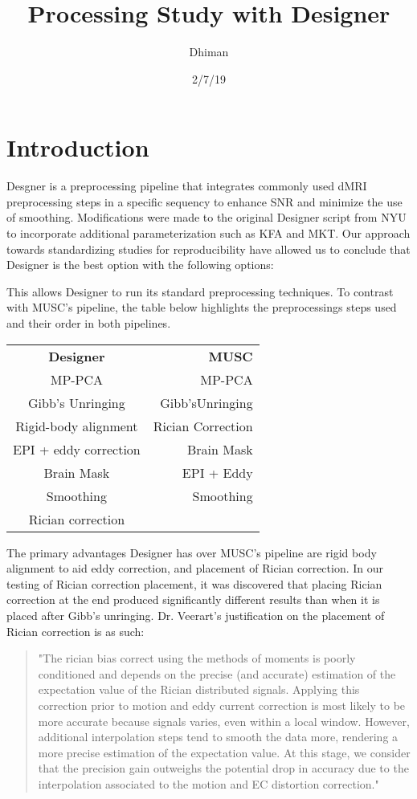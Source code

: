 \documentclass[12pt]{sop}
\title{Processing Study with Designer	}
\date{2/7/19}
\author{Dhiman}
\begin{document}
\maketitle
\section{Introduction}
Desgner is a preprocessing pipeline that integrates commonly used dMRI preprocessing steps in a specific sequency to enhance SNR and minimize the use of smoothing.
Modifications were made to the original Designer script from NYU to incorporate additional parameterization such as KFA and MKT.
Our approach towards standardizing studies for reproducibility have allowed us to conclude that Designer is the best option with the following options:

This allows Designer to run its standard preprocessing techniques. To contrast with MUSC's pipeline, the table below highlights the preprocessings steps used and their order in both pipelines.

\begin{tabular}{ | c | r |}
\textbf{Designer}      & \textbf{MUSC}              \\
MP-PCA               & MP-PCA            \\
Gibb's Unringing     & Gibb'sUnringing   \\
Rigid-body alignment & Rician Correction	\\
EPI + eddy correction & Brain Mask \\
Brain Mask & EPI + Eddy \\
Smoothing & Smoothing \\
Rician correction & 
\end{tabular}

The primary advantages Designer has over MUSC's pipeline are rigid body alignment to aid eddy correction, and placement of Rician correction. In our testing of Rician correction placement, it was discovered that placing Rician correction at the end produced significantly different results than when it is placed after Gibb's unringing. Dr. Veerart's justification on the placement of Rician correction is as such:

\begin{quote}
"The rician bias correct using the methods of moments is poorly conditioned and depends on the precise (and accurate) estimation of the expectation value of the Rician distributed signals.  Applying this correction prior to motion and eddy current correction is most likely to be more accurate because signals varies, even within a local window. However, additional interpolation steps tend to smooth the data more, rendering a more precise estimation of the expectation value. At this stage, we consider that the precision gain outweighs the potential drop in accuracy due to the interpolation associated to the motion and EC distortion correction."
\end{quote}
\end{document}
